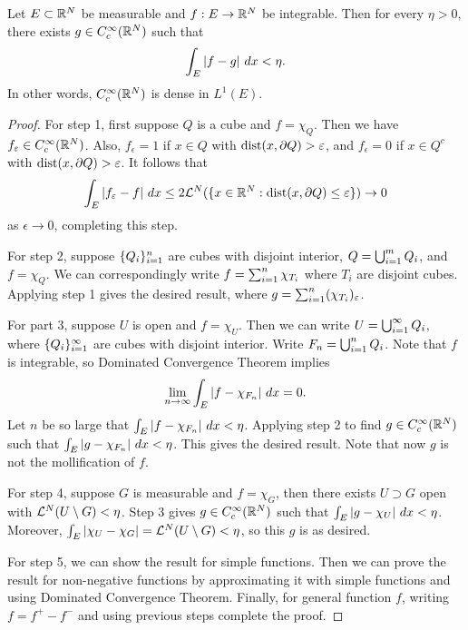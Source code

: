 \documentclass[a4paper]{article}
\begin{document}
\begin{thm}[density]

  Let $E \subset \mathbb{R}^N$ be measurable and $f : E \to \mathbb{R}^N$ be integrable.
  Then for every $\eta > 0$, there exists $g \in C_c^\infty (\mathbb{R}^N)$ such
  that
  \[
    \int_E \left\lvert f - g\right\rvert \, d x < \eta.
  \]
  In other words, $C_c^\infty (\mathbb{R}^N)$ is dense in $L^1 (E)$.
\end{thm}

\begin{proof}

  For step 1, first suppose $Q$ is a cube and $f = \chi_Q$. Then we have
  $f_\varepsilon \in C_c^\infty (\mathbb{R}^N)$. Also, $f_\epsilon = 1$ if $x \in Q$
  with $\operatorname{dist}(x, \partial Q) > \varepsilon$, and $f_\epsilon = 0$ if $x \in Q^c$
  with $\operatorname{dist}(x, \partial Q) > \varepsilon$. It follows that
  \[
    \int_E \left\lvert f_\varepsilon - f\right\rvert \, d x
    \leq 2 \mathcal{L}^N (\{x \in \mathbb{R}^N : \operatorname{dist}(x, \partial Q) \leq \varepsilon\})
    \to 0
  \]
  as $\epsilon \to 0$, completing this step.

  For step 2, suppose $\{ Q_i \}_{i=1}^n$ are cubes with disjoint interior, $Q
  = \bigcup_{i=1}^m Q_i$, and $f = \chi_{Q}$. We can correspondingly write $f =
  \sum_{i=1}^n \chi_{T_i}$ where $T_i$ are disjoint cubes. Applying step 1
  gives the desired result, where $g = \sum_{i=1}^n (\chi_{T_i})_\varepsilon$.

  For part 3, suppose $U$ is open and $f = \chi_U$. Then we can write $U =
  \bigcup_{i=1}^\infty{Q_i}$, where $\{ Q_i \}_{i=1}^\infty$ are cubes with disjoint interior.
  Write $F_n = \bigcup_{i=1}^n Q_i$. Note that $f$ is integrable, so Dominated
  Convergence Theorem implies
  \[
    \lim_{n \to \infty}
    \int_E \left\lvert f - \chi_{F_n}\right\rvert \, d x = 0.
  \]
  Let $n$ be so large that $\int_E \left\lvert f - \chi_{F_n}\right\rvert \, d x < \eta$.
  Applying step 2 to find $g \in C_c^\infty (\mathbb{R}^N)$ such that $\int_E
  \left\lvert g - \chi_{F_n}\right\rvert \, d x < \eta$. This gives the desired result. Note
  that now $g$ is not the mollification of $f$.

  For step 4, suppose $G$ is measurable and $f = \chi_G$, then there
  exists $U \supset G$ open with $\mathcal{L}^N (U \setminus G) < \eta$. Step 3
  gives $g \in C_c^\infty (\mathbb{R}^N)$ such that $\int_E \left\lvert g - \chi_U\right\rvert \, d x
  < \eta$. Moreover, $\int_E \left\lvert \chi_U - \chi_G\right\rvert = \mathcal{L}^N (U \setminus G)
  < \eta$, so this $g$ is as desired.

  For step 5, we can show the result for simple functions. Then we can
  prove the result for non-negative functions by approximating it with
  simple functions and using Dominated Convergence Theorem. Finally, for
  general function $f$, writing $f = f^+ - f^-$ and using previous steps
  complete the proof.
\end{proof}
\end{document}
